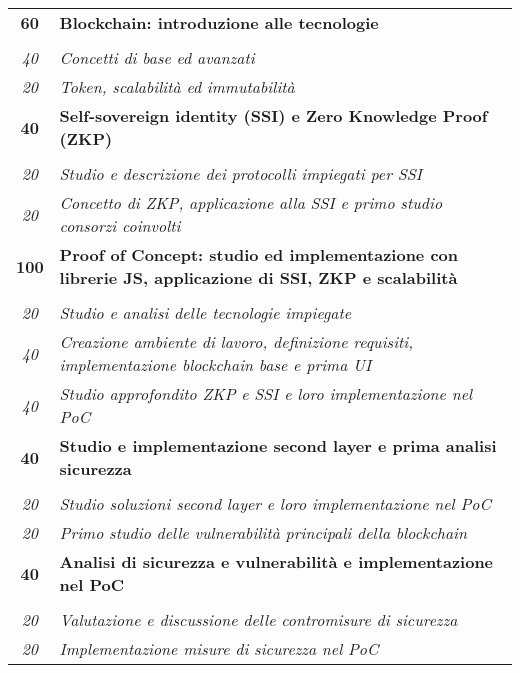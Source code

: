 

\begin{tabularx}{\textwidth}{|c|X|}
	\hline

    \textbf{60} & \textbf{Blockchain: introduzione alle tecnologie} \\ \hdashline 
    \multirow{2}{0cm}\\ 
    \textit{40} & 
    \textit{Concetti di base ed avanzati} \\
    \textit{20} & 
    \textit{Token, scalabilità ed immutabilità} \\
    \hline

    \textbf{40} & \textbf{Self-sovereign identity (SSI) e Zero Knowledge Proof (ZKP)} \\ \hdashline 
    \multirow{2}{0cm}\\ 
    \textit{20} & 
    \textit{Studio e descrizione dei protocolli impiegati per SSI} \\
    \textit{20} & 
    \textit{Concetto di ZKP, applicazione alla SSI e primo studio consorzi coinvolti} \\
    \hline

    \textbf{100} & \textbf{Proof of Concept: studio ed implementazione con librerie JS, applicazione di SSI, ZKP e scalabilità} \\ \hdashline 
    \multirow{3}{0cm}\\ 
    \textit{20} & 
    \textit{Studio e analisi delle tecnologie impiegate} \\
    \textit{40} & 
    \textit{Creazione ambiente di lavoro, definizione requisiti, implementazione blockchain base e prima UI} \\
    \textit{40} & 
    \textit{Studio approfondito ZKP e SSI e loro implementazione nel PoC} \\
    \hline

    \textbf{40} & \textbf{Studio e implementazione second layer e prima analisi sicurezza} \\ \hdashline 
    \multirow{2}{0cm}\\ 
    \textit{20} & 
    \textit{Studio soluzioni second layer e loro implementazione nel PoC} \\
    \textit{20} & 
    \textit{ Primo studio delle vulnerabilità principali della blockchain} \\
    \hline

    \textbf{40} & \textbf{Analisi di sicurezza e vulnerabilità e implementazione nel PoC} \\ \hdashline 
    \multirow{2}{0cm}\\ 
    \textit{20} & 
    \textit{Valutazione e discussione delle contromisure di sicurezza} \\
    \textit{20} & 
    \textit{Implementazione misure di sicurezza nel PoC} \\
    \hline


\end{tabularx}
